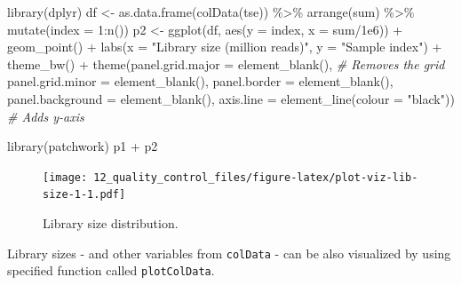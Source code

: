 \documentclass[
]{book}
\newenvironment{Shaded}{\begin{snugshade}}{\end{snugshade}}
\newcommand{\AttributeTok}[1]{\textcolor[rgb]{0.77,0.63,0.00}{#1}}
\newcommand{\CommentTok}[1]{\textcolor[rgb]{0.56,0.35,0.01}{\textit{#1}}}
\newcommand{\DecValTok}[1]{\textcolor[rgb]{0.00,0.00,0.81}{#1}}
\newcommand{\FloatTok}[1]{\textcolor[rgb]{0.00,0.00,0.81}{#1}}
\newcommand{\FunctionTok}[1]{\textcolor[rgb]{0.00,0.00,0.00}{#1}}
\newcommand{\NormalTok}[1]{#1}
\newcommand{\OtherTok}[1]{\textcolor[rgb]{0.56,0.35,0.01}{#1}}
\newcommand{\SpecialCharTok}[1]{\textcolor[rgb]{0.00,0.00,0.00}{#1}}
\newcommand{\StringTok}[1]{\textcolor[rgb]{0.31,0.60,0.02}{#1}}
\begin{document}
\begin{Shaded}
\begin{Highlighting}[]
\FunctionTok{library}\NormalTok{(dplyr)}
\NormalTok{df }\OtherTok{\textless{}{-}} \FunctionTok{as.data.frame}\NormalTok{(}\FunctionTok{colData}\NormalTok{(tse)) }\SpecialCharTok{\%\textgreater{}\%}
        \FunctionTok{arrange}\NormalTok{(sum) }\SpecialCharTok{\%\textgreater{}\%}
        \FunctionTok{mutate}\NormalTok{(}\AttributeTok{index =} \DecValTok{1}\SpecialCharTok{:}\FunctionTok{n}\NormalTok{())}
\NormalTok{p2 }\OtherTok{\textless{}{-}} \FunctionTok{ggplot}\NormalTok{(df, }\FunctionTok{aes}\NormalTok{(}\AttributeTok{y =}\NormalTok{ index, }\AttributeTok{x =}\NormalTok{ sum}\SpecialCharTok{/}\FloatTok{1e6}\NormalTok{)) }\SpecialCharTok{+}
        \FunctionTok{geom\_point}\NormalTok{() }\SpecialCharTok{+}  
        \FunctionTok{labs}\NormalTok{(}\AttributeTok{x =} \StringTok{"Library size (million reads)"}\NormalTok{, }\AttributeTok{y =} \StringTok{"Sample index"}\NormalTok{) }\SpecialCharTok{+}  
        \FunctionTok{theme\_bw}\NormalTok{() }\SpecialCharTok{+}
        \FunctionTok{theme}\NormalTok{(}\AttributeTok{panel.grid.major =} \FunctionTok{element\_blank}\NormalTok{(), }\CommentTok{\# Removes the grid}
          \AttributeTok{panel.grid.minor =} \FunctionTok{element\_blank}\NormalTok{(),}
          \AttributeTok{panel.border =} \FunctionTok{element\_blank}\NormalTok{(),}
          \AttributeTok{panel.background =} \FunctionTok{element\_blank}\NormalTok{(),}
          \AttributeTok{axis.line =} \FunctionTok{element\_line}\NormalTok{(}\AttributeTok{colour =} \StringTok{"black"}\NormalTok{)) }\CommentTok{\# Adds y{-}axis}

\FunctionTok{library}\NormalTok{(patchwork)}
\NormalTok{p1 }\SpecialCharTok{+}\NormalTok{ p2}
\end{Highlighting}
\end{Shaded}

\begin{figure}
\centering
\texttt{[image: 12\_quality\_control\_files/figure-latex/plot-viz-lib-size-1-1.pdf]}
\caption{\label{fig:plot-viz-lib-size-1}Library size distribution.}
\end{figure}

Library sizes - and other variables from \texttt{colData} - can be also
visualized by using specified function called \texttt{plotColData}.
\end{document}
